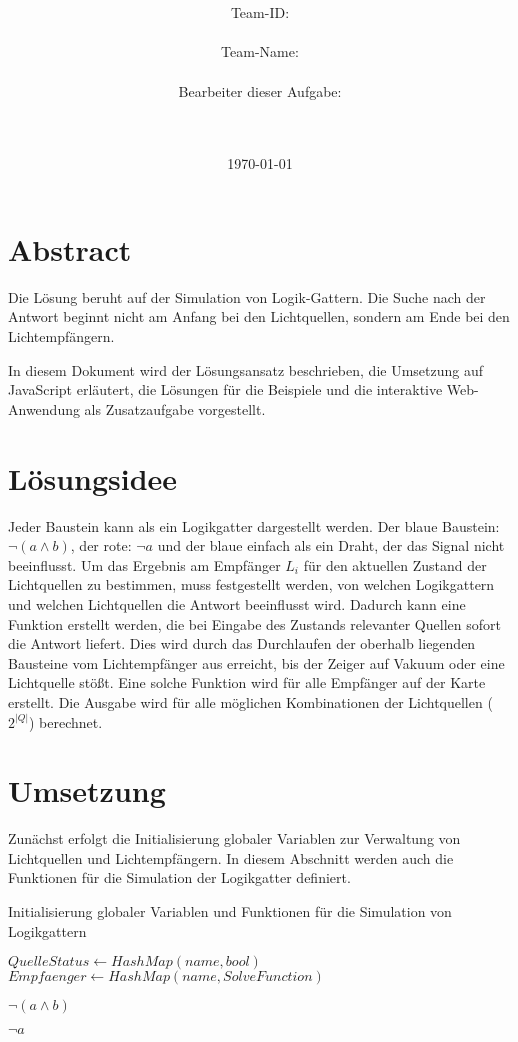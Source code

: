 \documentclass[a4paper,10pt,ngerman]{scrartcl}
\title{\textbf{\Huge\Aufgabe}}
\author{\LARGE Team-ID: \LARGE \TeamId \\\\
	    \LARGE Team-Name: \LARGE \TeamName \\\\
	    \LARGE Bearbeiter dieser Aufgabe: \\ 
	    \LARGE \Namen\\\\}
\date{\LARGE\today}
\begin{document}
\maketitle
\tableofcontents

\vspace{0.5cm}

\section{Abstract}

Die Lösung beruht auf der Simulation von Logik-Gattern. Die Suche nach der Antwort beginnt nicht am Anfang bei den Lichtquellen, sondern am Ende bei den Lichtempfängern.

In diesem Dokument wird der Lösungsansatz beschrieben, die Umsetzung auf JavaScript erläutert, die Lösungen für die Beispiele und die interaktive Web-Anwendung als Zusatzaufgabe vorgestellt.

\section{Lösungsidee}

Jeder Baustein kann als ein Logikgatter dargestellt werden. Der blaue Baustein: $\lnot (a \land b)$, der rote: $\lnot a$ und der blaue einfach als ein Draht, der das Signal nicht beeinflusst.
Um das Ergebnis am Empfänger \(L_i\) für den aktuellen Zustand der Lichtquellen zu bestimmen, muss festgestellt werden, von welchen Logikgattern und welchen Lichtquellen die Antwort beeinflusst wird. Dadurch kann eine Funktion erstellt werden, die bei Eingabe des Zustands relevanter Quellen sofort die Antwort liefert. Dies wird durch das Durchlaufen der oberhalb liegenden Bausteine vom Lichtempfänger aus erreicht, bis der Zeiger auf Vakuum oder eine Lichtquelle stößt.
Eine solche Funktion wird für alle Empfänger auf der Karte erstellt. Die Ausgabe wird für alle möglichen Kombinationen der Lichtquellen (\(2^{|Q|}\)) berechnet.

\newpage
\section{Umsetzung}

Zunächst erfolgt die Initialisierung globaler Variablen zur Verwaltung von Lichtquellen und Lichtempfängern. In diesem Abschnitt werden auch die Funktionen für die Simulation der Logikgatter definiert.

\begin{algorithm}
    \caption{Initialisierung globaler Variablen und Funktionen für die Simulation von Logikgattern}
\begin{algorithmic}
 
\State $QuelleStatus \gets HashMap(name, bool)$
\State $Empfaenger \gets HashMap(name, SolveFunction)$

\State \Return $\lnot (a \land b)$
\EndFunction

\State \Return $\lnot a$
\EndFunction
\end{algorithmic}
\end{algorithm}
\end{document}
